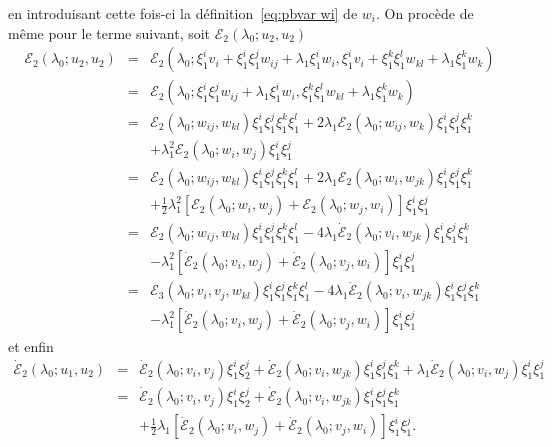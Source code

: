 \documentclass{article}
\newcommand{\nocomma}{}
\newcommand{\nosymbol}{}
\begin{document}
en introduisant cette fois-ci la définition~\eqref{eq:pbvar wi} de $w_i .$
On procède de même pour le terme suivant, soit $\mathcal{E}_2
(\lambda_0 ; u_2, u_2)$
\begin{eqnarray*}
  \mathcal{E}_2 (\lambda_0 ; u_2, u_2) & = & \mathcal{E}_2 (\lambda_0 ;
  \xi_1^i v_i + \xi_1^i \xi_1^j w_{i \nocomma j} + \lambda_1 \xi_1^i w_i,
  \xi_1^i v_i + \xi_1^k \xi_1^l w_{k \nocomma l} + \lambda_1 \xi_1^k w_k)\\
  & = & \mathcal{E}_2 (\lambda_0 ; \xi_1^i \xi_1^j w_{i \nocomma j} +
  \lambda_1 \xi_1^i w_i, \xi_1^k \xi_1^l w_{k \nocomma l} + \lambda_1 \xi_1^k
  w_k)\\
  & = & \mathcal{E}_2 (\lambda_0 ; w_{i \nocomma j}, w_{k \nocomma l})
  \xi_1^i \xi_1^j \xi_1^k \xi_1^l + 2 \lambda_1 \mathcal{E}_2 (\lambda_0 ;
  w_{i \nocomma j}, w_k) \xi_1^i \xi_1^j \xi_1^k\\
  &  & \nosymbol + \lambda_1^2 \mathcal{E}_2 (\lambda_0 ; w_i, w_j) \xi_1^i
  \xi_1^j\\
  & = & \mathcal{E}_2 (\lambda_0 ; w_{i \nocomma j}, w_{k \nocomma l})
  \xi_1^i \xi_1^j \xi_1^k \xi_1^l + 2 \lambda_1 \mathcal{E}_2 (\lambda_0 ;
  w_i, w_{j \nocomma k}) \xi_1^i \xi_1^j \xi_1^k\\
  &  & \nosymbol + \tfrac{1}{2} \lambda_1^2  [\mathcal{E}_2 (\lambda_0 ; w_i,
  w_j) +\mathcal{E}_2 (\lambda_0 ; w_j, w_i)] \xi_1^i \xi_1^j\\
  & = & \mathcal{E}_2 (\lambda_0 ; w_{i \nocomma j}, w_{k \nocomma l})
  \xi_1^i \xi_1^j \xi_1^k \xi_1^l - 4 \lambda_1  \dot{\mathcal{E}}_2
  (\lambda_0 ; v_i, w_{j \nocomma k}) \xi_1^i \xi_1^j \xi_1^k\\
  &  & \nosymbol - \lambda_1^2  [\dot{\mathcal{E}}_2 (\lambda_0 ; v_i, w_j) +
  \dot{\mathcal{E}}_2 (\lambda_0 ; v_j, w_i)] \xi_1^i \xi_1^j\\
  & = & \mathcal{E}_3 (\lambda_0 ; v_i, v_j, w_{k \nocomma l}) \xi_1^i
  \xi_1^j \xi_1^k \xi_1^l - 4 \lambda_1  \dot{\mathcal{E}}_2 (\lambda_0 ; v_i,
  w_{j \nocomma k}) \xi_1^i \xi_1^j \xi_1^k\\
  &  & \nosymbol - \lambda_1^2  [\dot{\mathcal{E}}_2 (\lambda_0 ; v_i, w_j) +
  \dot{\mathcal{E}}_2 (\lambda_0 ; v_j, w_i)] \xi_1^i \xi_1^j
\end{eqnarray*}
et enfin
\begin{eqnarray*}
  \dot{\mathcal{E}}_2 (\lambda_0 ; u_1, u_2) & = & \dot{\mathcal{E}}_2
  (\lambda_0 ; v_i, v_j) \xi_1^i \xi_2^j + \dot{\mathcal{E}}_2 (\lambda_0 ;
  v_i, w_{j \nocomma k}) \xi_1^i \xi_1^j \xi_1^k + \lambda_1
  \dot{\mathcal{E}}_2 (\lambda_0 ; v_i, w_j) \xi_1^i \xi_1^j\\
  & = & \dot{\mathcal{E}}_2 (\lambda_0 ; v_i, v_j) \xi_1^i \xi_2^j +
  \dot{\mathcal{E}}_2 (\lambda_0 ; v_i, w_{j \nocomma k}) \xi_1^i \xi_1^j
  \xi_1^k\\
  &  & \nosymbol + \tfrac{1}{2} \lambda_1  [\dot{\mathcal{E}}_2 (\lambda_0 ;
  v_i, w_j) + \dot{\mathcal{E}}_2 (\lambda_0 ; v_j, w_i)] \xi_1^i \xi_1^j .
\end{eqnarray*}
\end{document}
